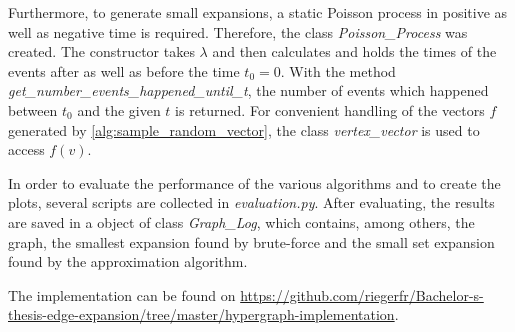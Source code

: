 Furthermore, to generate small expansions, a static Poisson process in positive as well as negative time is required. Therefore, the class \textit{Poisson\_Process} was created. The constructor takes $\lambda$ and then calculates and holds the times of the events after as well as before the time $t_0=0$. With the method \textit{get\_number\_events\_happened\_until\_t}, the number of events which happened between $t_0$ and the given $t$ is returned. 
For convenient handling of the vectors $f$ generated by \cref{alg:sample_random_vector}, the class \textit{vertex\_vector} is used to access $f(v)$.

In order to evaluate the performance of the various algorithms and to create the plots, several scripts are collected in \textit{evaluation.py}.
After evaluating, the results are saved in a object of class \textit{Graph\_Log}, which contains, among others, the graph, the smallest expansion found by brute-force and the small set expansion found by the approximation algorithm.

The implementation can be found on \href{https://github.com/riegerfr/Bachelor-s-thesis-edge-expansion/tree/master/hypergraph-implementation}{https://github.com/riegerfr/Bachelor-s-thesis-edge-expansion/tree/master/hypergraph-implementation}. %
